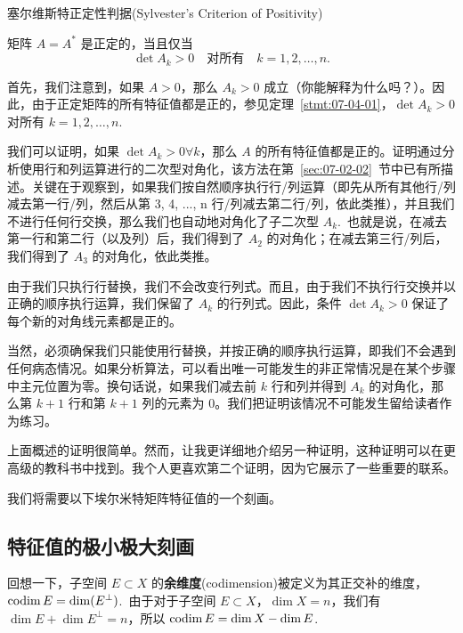 \begin{theorem}\label{stmt:07-04-02} 塞尔维斯特正定性判据(Sylvester’s Criterion of Positivity)

矩阵 $A = A^*$ 是正定的，当且仅当 $$\det A_k > 0 \quad\text{对所有}\quad k = 1, 2, \dots, n.$$\end{theorem}

首先，我们注意到，如果 $A > 0$，那么 $A_k > 0$ 成立（你能解释为什么吗？）。因此，由于正定矩阵的所有特征值都是正的，参见定理~\ref{stmt:07-04-01}，$\det A_k > 0$ 对所有 $k = 1, 2, \dots, n$.~

我们可以证明，如果 $\det A_k > 0 \forall k$，那么 $A$ 的所有特征值都是正的。证明通过分析使用行和列运算进行的二次型对角化，该方法在第~\ref{sec:07-02-02}~节中已有所描述。关键在于观察到，如果我们按自然顺序执行行/列运算（即先从所有其他行/列减去第一行/列，然后从第 3, 4, ..., n 行/列减去第二行/列，依此类推），并且我们不进行任何行交换，那么我们也自动地对角化了子二次型 $A_k$.~也就是说，在减去第一行和第二行（以及列）后，我们得到了 $A_2$ 的对角化；在减去第三行/列后，我们得到了 $A_3$ 的对角化，依此类推。

由于我们只执行行替换，我们不会改变行列式。而且，由于我们不执行行交换并以正确的顺序执行运算，我们保留了 $A_k$ 的行列式。因此，条件 $\det A_k > 0$ 保证了每个新的对角线元素都是正的。

当然，必须确保我们只能使用行替换，并按正确的顺序执行运算，即我们不会遇到任何病态情况。如果分析算法，可以看出唯一可能发生的非正常情况是在某个步骤中主元位置为零。换句话说，如果我们减去前 $k$ 行和列并得到 $A_k$ 的对角化，那么第 $k+1$ 行和第 $k+1$ 列的元素为 0。我们把证明该情况不可能发生留给读者作为练习。

上面概述的证明很简单。然而，让我更详细地介绍另一种证明，这种证明可以在更高级的教科书中找到。我个人更喜欢第二个证明，因为它展示了一些重要的联系。

我们将需要以下埃尔米特矩阵特征值的一个刻画。


\subsection{特征值的极小极大刻画}\label{sec:07-04-02}


回想一下，子空间 $E \subset X$ 的\textbf{余维度}(codimension)被定义为其正交补的维度，$\operatorname{codim} E = \dim(E^\perp)$.~由于对于子空间 $E \subset X$，$\dim X = n$，我们有 $\dim E + \dim E^\perp = n$，所以 $\operatorname{codim} E = \dim X - \dim E$.~

